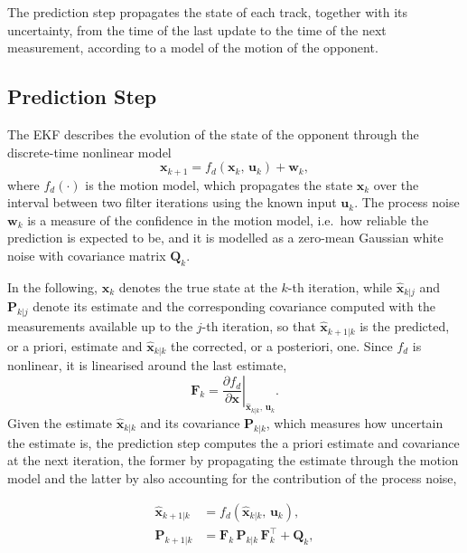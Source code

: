 The prediction step propagates the state of each track, together with its uncertainty,
from the time of the last update to the time of the next measurement, according to a
model of the motion of the opponent.

\subsection{Prediction Step}
\label{subsec:tt_prediction}

The EKF describes the evolution of the state of the opponent through the discrete-time
nonlinear model
\begin{equation}
    \mathbf{x}_{k+1} = f_d(\mathbf{x}_k,\,\mathbf{u}_k) + \mathbf{w}_k,
    \label{eq:tt_system}
\end{equation}
where $f_d(\cdot)$ is the motion model, which propagates the state $\mathbf{x}_k$ over the
interval between two filter iterations using the known input $\mathbf{u}_k$. The process
noise $\mathbf{w}_k$ is a measure of the confidence in the motion model, i.e.\ how
reliable the prediction is expected to be, and it is modelled as a zero-mean Gaussian
white noise with covariance matrix $\mathbf{Q}_k$.

In the following, $\mathbf{x}_k$ denotes the true state at the $k$-th iteration, while
$\hat{\mathbf{x}}_{k|j}$ and $\mathbf{P}_{k|j}$ denote its estimate and the corresponding
covariance computed with the measurements available up to the $j$-th iteration, so that
$\hat{\mathbf{x}}_{k+1|k}$ is the predicted, or a priori, estimate and
$\hat{\mathbf{x}}_{k|k}$ the corrected, or a posteriori, one. Since $f_d$ is nonlinear, it is
linearised around the last estimate,
\begin{equation}
    \mathbf{F}_k = \left.\frac{\partial f_d}{\partial \mathbf{x}}\right|_{\hat{\mathbf{x}}_{k|k},\,\mathbf{u}_k}.
    \label{eq:tt_F_def}
\end{equation}
Given the estimate $\hat{\mathbf{x}}_{k|k}$ and its covariance $\mathbf{P}_{k|k}$, which
measures how uncertain the estimate is, the prediction step computes the a priori estimate and
covariance at the next iteration, the former by propagating the estimate through the motion
model and the latter by also accounting for the contribution of the process noise,

\begin{equation}
    \begin{aligned}
        \hat{\mathbf{x}}_{k+1|k} &= f_d(\hat{\mathbf{x}}_{k|k},\,\mathbf{u}_k), \\
        \mathbf{P}_{k+1|k} &= \mathbf{F}_k\,\mathbf{P}_{k|k}\,\mathbf{F}_k^\top + \mathbf{Q}_k,
    \end{aligned}
    \label{eq:tt_prediction}
\end{equation}

